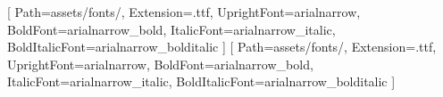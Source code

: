 %

\usepackage{fontspec}

\setmainfont{Arial Narrow}[
  Path=assets/fonts/,
  Extension=.ttf,
  UprightFont=arialnarrow,
  BoldFont=arialnarrow_bold,
  ItalicFont=arialnarrow_italic,
  BoldItalicFont=arialnarrow_bolditalic
]
\setsansfont{Arial Narrow}[
  Path=assets/fonts/,
  Extension=.ttf,
  UprightFont=arialnarrow,
  BoldFont=arialnarrow_bold,
  ItalicFont=arialnarrow_italic,
  BoldItalicFont=arialnarrow_bolditalic
]
\renewcommand{\familydefault}{\sfdefault}

\usepackage[portuguese]{babel}
\usepackage[margin=2.5cm,top=3.5cm]{geometry}
\usepackage{setspace}
\singlespacing
\usepackage{graphicx}
\usepackage{float}
\usepackage{caption}
\usepackage{booktabs}
\usepackage{indentfirst}
\setlength{\parindent}{1.25cm}

\usepackage{xcolor}
\usepackage{tcolorbox}

\usepackage{fancyhdr}
\usepackage{emptypage}
\usepackage{titlesec}
\usepackage{import}
\usepackage{csquotes}
\usepackage[style=abnt,backend=biber]{biblatex}


